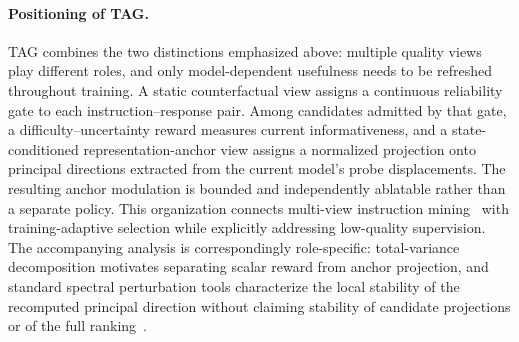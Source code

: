 \paragraph{Positioning of TAG.}
TAG combines the two distinctions emphasized above: multiple quality
views play different roles, and only model-dependent usefulness needs
to be refreshed throughout training. A static counterfactual view
assigns a continuous reliability gate to each
instruction--response pair. Among candidates admitted by that gate, a
difficulty--uncertainty reward measures current informativeness, and
a state-conditioned representation-anchor view assigns a normalized
projection onto principal directions extracted from the current
model's probe displacements. The resulting anchor modulation is
bounded and independently ablatable rather than a separate policy.
This organization connects multi-view instruction
mining~\cite{huang2024ivm} with training-adaptive selection while
explicitly addressing low-quality supervision. The accompanying
analysis is correspondingly role-specific: total-variance
decomposition motivates separating scalar reward from anchor
projection, and standard spectral perturbation tools characterize the
local stability of the recomputed principal direction without claiming
stability of candidate projections or of the full
ranking~\cite{davis1970rotation,stewart1990matrix}.



